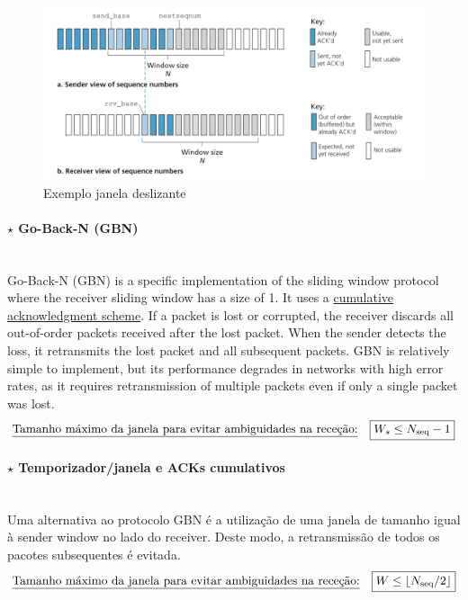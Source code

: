 \begin{figure}[H]
    \centering
    \includegraphics[width = 0.9\linewidth]{img/3/send-and-receive-windows.png}
    \caption{Exemplo janela deslizante}
    \label{fig:send-and-receive-windows}
\end{figure}

\paragraph[3.4.3.1 Go-Back-N (GBN)]{$\pmb{\star}$ Go-Back-N (GBN)}\mbox{}\\[4pt]
Go-Back-N (GBN) is a specific implementation of the sliding window protocol where the receiver sliding window has a size of 1. It uses a \underline{cumulative acknowledgment scheme}. If a packet is lost or corrupted, the receiver discards all out-of-order packets received after the lost packet. When the sender detects the loss, it retransmits the lost packet and all subsequent packets. GBN is relatively simple to implement, but its performance degrades in networks with high error rates, as it requires retransmission of multiple packets even if only a single packet was lost.
$$
    \text{\underline{Tamanho máximo da janela para evitar ambiguidades na receção:}} \quad \boxed{W_s \leq N_\text{seq} - 1}
$$

\paragraph[3.4.3.2 Temporizador/janela e ACKs cumulativos]{$\pmb{\star}$ Temporizador/janela e ACKs cumulativos}\mbox{}\\[4pt]
Uma alternativa ao protocolo GBN é a utilização de uma janela de tamanho igual à sender window no lado do receiver. Deste modo, a retransmissão de todos os pacotes subsequentes é evitada.
$$
    \text{\underline{Tamanho máximo da janela para evitar ambiguidades na receção:}} \quad \boxed{W \leq \left\lfloor N_\text{seq}/2 \right\rfloor}
$$

